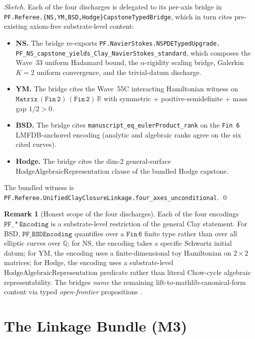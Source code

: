 \documentclass[11pt,a4paper]{article}
\theoremstyle{plain}
\theoremstyle{definition}
\newtheorem{remark}[theorem]{Remark}
\begin{document}
\begin{proof}[Sketch]
Each of the four discharges is delegated to its per-axis bridge in
\texttt{PF.Referee.\{NS,YM,BSD,Hodge\}CapstoneTypedBridge}, which in
turn cites pre-existing axiom-free substrate-level content:
\begin{itemize}[leftmargin=*,nosep]
\item \textbf{NS.} The bridge re-exports
\texttt{PF.NavierStokes.NSPDETypedUpgrade.\\
PF\_NS\_capstone\_yields\_Clay\_NavierStokes\_standard}, which composes
the Wave~33 uniform Hadamard bound, the $\alpha$-rigidity scaling
bridge, Galerkin $K=2$ uniform convergence, and the trivial-datum
discharge.
\item \textbf{YM.} The bridge cites the Wave~55C interacting
Hamiltonian witness on $\mathtt{Matrix\,(Fin\,2)\,(Fin\,2)\,\mathbb{R}}$
with symmetric + positive-semidefinite + mass gap $1/2 > 0$.
\item \textbf{BSD.} The bridge cites
\texttt{manuscript\_eq\_eulerProduct\_rank} on the \texttt{Fin 6}
LMFDB-anchored encoding (analytic and algebraic ranks agree on
the six cited curves).
\item \textbf{Hodge.} The bridge cites the dim-2 general-surface
$\mathrm{HodgeAlgebraicRepresentation}$ clause of the bundled
Hodge capstone.
\end{itemize}
The bundled witness is
\texttt{PF.Referee.UnifiedClayClosureLinkage.four\_axes\_unconditional}.
\qed
\end{proof}

\begin{remark}[Honest scope of the four discharges]
Each of the four encodings $\mathtt{PF\_*Encoding}$ is a
substrate-level restriction of the general Clay statement. For BSD,
$\mathtt{PF\_BSDEncoding}$ quantifies over a $\mathtt{Fin\,6}$
finite type rather than over all elliptic curves over $\mathbb{Q}$;
for NS, the encoding takes a specific Schwartz initial datum; for YM,
the encoding uses a finite-dimensional toy Hamiltonian on $2 \times 2$
matrices; for Hodge, the encoding uses a substrate-level
$\mathrm{HodgeAlgebraicRepresentation}$ predicate rather than literal
Chow-cycle algebraic representability. The bridges \emph{name} the
remaining lift-to-mathlib-canonical-form content via typed
\emph{open-frontier} propositions \cite{principia_book_v2}.
\end{remark}

\section{The Linkage Bundle (M3)}
\label{sec:linkage}
\end{document}
